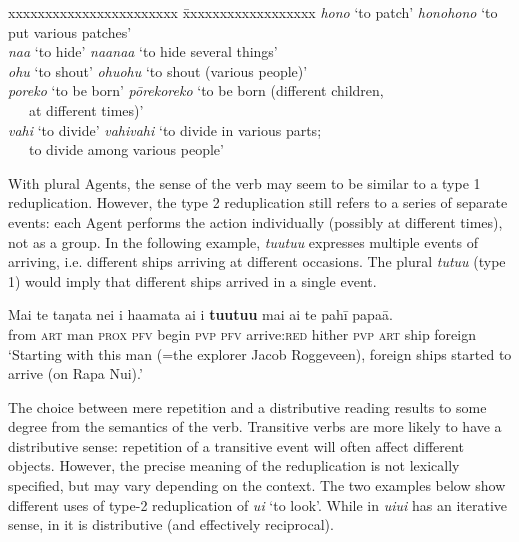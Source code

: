 \ea
\begin{tabbing}
 xxxxxxxxxxxxxxxxxxxxxxx \= xxxxxxxxxxxxxxxxxx\kill
  \textit{hono} ‘to patch’  \>  \textit{honohono} ‘to put various patches’\\
  \textit{na{\ꞌ}a} ‘to hide’  \>  \textit{na{\ꞌ}ana{\ꞌ}a} ‘to hide several things’\\
  \textit{ohu} ‘to shout’  \>  \textit{ohuohu} ‘to shout (various people)’\\
  \textit{poreko} ‘to be born’  \>  \textit{pōrekoreko} ‘to be born (different children, \\
 \> ~~~at different times)’\\
  \textit{vahi} ‘to divide’  \>  \textit{vahivahi} ‘to divide in various parts; \\
 \> ~~~to divide among various people’
\end{tabbing}
\z 
With plural Agents, the sense of the verb may seem to be similar to a type 1 reduplication. However, the type 2 reduplication still refers to a series of separate events: each Agent performs the action individually (possibly at different times), not as a group. In the following example, \textit{tu{\ꞌ}utu{\ꞌ}u} expresses multiple events of arriving, i.e. different ships arriving at different occasions. The plural \textit{tutu{\ꞌ}u} (type 1) would imply that different ships arrived in a single event.

\ea\label{ex:2.21}
\gll Mai te taŋata nei i ha{\ꞌ}amata ai i \textbf{tu{\ꞌ}utu{\ꞌ}u} mai ai te pahī papa{\ꞌ}ā. \\
from \textsc{art} man \textsc{prox} \textsc{pfv} begin \textsc{pvp} \textsc{pfv} arrive:\textsc{red} hither \textsc{pvp} \textsc{art} ship foreign \\

\glt 
‘Starting with this man (=the explorer Jacob Roggeveen), foreign ships started to arrive (on Rapa Nui).’ \textstyleExampleref{[R111.014]} 
\z

The choice between mere repetition and a distributive reading results to some degree from the semantics of the verb. Transitive verbs are more likely to have a distributive sense: repetition of a transitive event will often affect different objects. However, the precise meaning of the reduplication is not lexically specified, but may vary depending on the context. The two examples below show different uses of type-2 reduplication of \textit{u{\ꞌ}i} ‘to look’. While in  \textit{u{\ꞌ}iu{\ꞌ}i} has an iterative sense, in  it is distributive (and effectively reciprocal).

